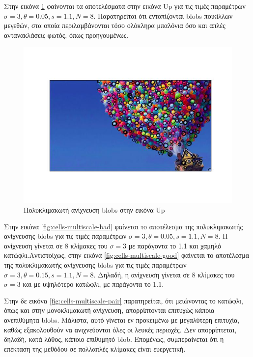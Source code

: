 \documentclass{article}
\newcommand{\eng}[1]{\foreignlanguage{english}{#1}}
\begin{document}
Στην εικόνα \ref{fig:up-multiscale} φαίνονται τα αποτελέσματα στην εικόνα \eng{Up} για τις τιμές παραμέτρων $\sigma = 3, \theta = 0.05, s = 1.1, N = 8$. Παρατηρείται ότι εντοπίζονται \eng{blobs} ποικίλλων μεγεθών, στα οποία περιλαμβάνονται τόσο ολόκληρα μπαλόνια όσο και απλές αντανακλάσεις φωτός, όπως προηγουμένως.
\begin{figure}[h]
    \centering
    \includegraphics[width=\textwidth]{../image-plots/blob-detection-multiscale-up.jpg}
    \caption{Πολυκλιμακωτή ανίχνευση \eng{blobs} στην εικόνα \eng{Up}}
    \label{fig:up-multiscale}
\end{figure}
\FloatBarrier

Στην εικόνα \ref{fig:cells-multiscale-bad} φαίνεται το αποτέλεσμα της πολυκλιμακωτής ανίχνευσης \eng{blobs} για τις τιμές παραμέτρων $\sigma = 3, \theta = 0.05, s = 1.1, N = 8$. Η ανίχνευση γίνεται σε 8 κλίμακες του $\sigma = 3$ με παράγοντα το 1.1 και χαμηλό κατώφλι.Αντιστοίχως, στην εικόνα \ref{fig:cells-multiscale-good} φαίνεται το αποτέλεσμα της πολυκλιμακωτής ανίχνευσης \eng{blobs} για τις τιμές παραμέτρων $\sigma = 3, \theta = 0.15, s = 1.1, N = 8$. Δηλαδή, η ανίχνευση γίνεται σε 8 κλίμακες  του $\sigma = 3$ και με υψηλότερο κατώφλι, με παράγοντα το 1.1.

Στην δε εικόνα \ref{fig:cells-multiscale-pair} παρατηρείται, ότι μειώνοντας το κατώφλι, όπως και στην μονοκλιμακωτή ανίχνευση, απορρίπτονται επιτυχώς κάποια ανεπιθύμητα \eng{blobs}. Μάλιστα, αυτό γίνεται εν προκειμένω με μεγαλύτερη επιτυχία, καθώς εξακολουθούν να ανιχνεύονται όλες οι λευκές περιοχές. Δεν απορρίπτεται, δηλαδή, κατά λάθος, κάποιο επιθυμητό \eng{blob}. Επομένως, συμπεραίνεται ότι η επέκταση της μεθόδου σε πολλαπλές κλίμακες είναι ευεργετική.
\end{document}
